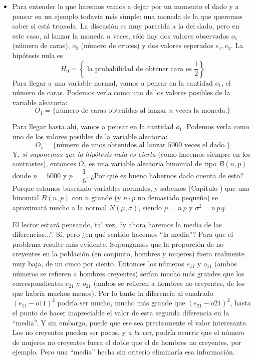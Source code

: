 \begin{itemize}
    \item Para entender lo que haremos vamos a dejar por un momento el dado y a pensar en un ejemplo todavía más simple: una moneda de la que queremos saber si está trucada. La discusión es muy parecida a la del dado, pero en este caso, al lanzar la moneda $n$ veces, sólo hay dos valores observados $o_1$ (número de caras), $o_2$ (número de cruces) y dos valores esperados $e_1,e_2$. La hipótesis nula es
        \[H_0=\left\{\mbox{ la probabilidad de obtener cara es $\dfrac{1}{2}$} \right\}\]
        Para llegar a una variable normal, vamos a pensar en la cantidad $o_1$, el número de caras. Podemos verla como uno de los valores posibles de la variable aleatoria:
        \[O_1=\{\mbox{número de caras obtenidas al lanzar $n$ veces la moneda.}\}\]


        Para llegar hasta ahí, vamos a pensar en la cantidad $o_1$. Podemos verla como uno de los valores posibles de la variable aleatoria:
        \[O_1=\{\mbox{número de unos obtenidos al lanzar 5000 veces el dado.}\}\]
        Y, {\em si suponemos que la hipótesis nula es cierta} (como hacemos siempre en los contrastes), entonces $O_1$ es una variable aleatoria binomial de tipo $B(n,p)$ donde $n=5000$ y $p=\dfrac{1}{6}$. ¿Por qué es bueno habernos dado cuenta de esto? Porque estamos buscando variables normales, y sabemos (Capítulo ) que una binomial $B(n,p)$ con $n$ grande (y $n\cdot p$ no demasiado pequeño) se aproximará mucho a la normal $N(\mu,\sigma)$, siendo $\mu=n\,p$ y $\sigma^2=n\,p\,q$.


        El lector estará pensando, tal vez, ``y ahora haremos la media de las diferencias...''. Sí, pero ¿en qué sentido hacemos ``la media''? Para que el problema resulte más evidente. Supongamos que la proporción de no creyentes en la población (en conjunto, hombres y mujeres) fuera realmente muy baja, de un cinco por ciento. Entonces los números  $e_{11}$ y $o_{11}$ (ambos números se refieren a hombres creyentes) serían mucho más grandes que los correspondientes $e_{21}$ y $o_{21}$ (ambos se refieren a hombres no creyentes, de los que habría muchos menos). Por lo tanto la diferencia al cuadrado $(e_{11}-o{11})^2$ podría ser mucho, mucho más grande que $(e_{21}-o{21})^2$, hasta el punto de hacer inapreciable el valor de esta segunda diferencia en la ``media''. Y sin embargo, puede que ese sea precisamente el valor interesante. Los no creyentes pueden ser pocos, y {\em a la vez}, podría ocurrir que el número de mujeres no creyentes fuera el doble que el de hombres no creyentes, por ejemplo. Pero una ``media'' hecha sin criterio eliminaría esa información.


\end{itemize}
